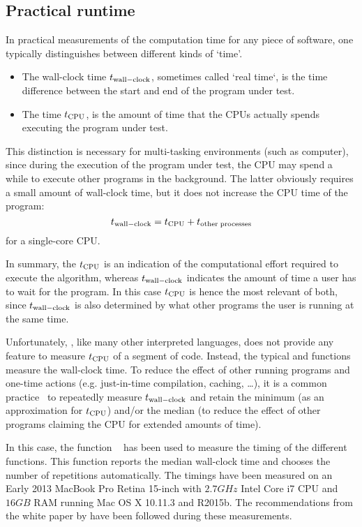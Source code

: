 \subsection{Practical runtime}
In practical measurements of the computation time for any piece of software, one typically distinguishes between different kinds of `time'.
\begin{itemize}
  \item The wall-clock time $t_{\mathrm{wall-clock}}$, sometimes called `real time`, is the time difference between the start and end of the program under test.
  \item The  time $t_{\mathrm{CPU}}$, is the amount of time that the \glspl{CPU} actually spends executing the program under test.
\end{itemize}
This distinction is necessary for multi-tasking environments (such as computer), since during the execution of the program under test, the \gls{CPU} may spend a while to execute other programs in the background.
The latter obviously requires a small amount of wall-clock time, but it does not increase the \gls{CPU} time of the program:
\begin{equation}
  t_{\mathrm{wall-clock}} = t_{\mathrm{CPU}} + t_{\mathrm{other\;processes}}
\end{equation}
for a single-core \gls{CPU}.

In summary, the $t_{\mathrm{CPU}}$ is an indication of the computational effort required to execute the algorithm, whereas $t_{\mathrm{wall-clock}}$ indicates the amount of time a user has to wait for the program.
In this case $t_{\mathrm{CPU}}$ is hence the most relevant of both, since $t_{\mathrm{wall-clock}}$ is also determined by what other programs the user is running at the same time.

Unfortunately, \MATLAB, like many other interpreted languages, does not provide any feature to measure $t_{\mathrm{CPU}}$ of a segment of code.
Instead, the typical  and  functions measure the wall-clock time.
To reduce the effect of other running programs and one-time actions (e.g. just-in-time compilation, caching, \ldots), it is a common practice~\citep{McKeeman2008} to repeatedly measure $t_{\mathrm{wall-clock}}$ and retain the minimum (as an approximation for $t_{\mathrm{CPU}}$) and/or the median (to reduce the effect of other programs claiming the \gls{CPU} for extended amounts of time).

In this case, the \MATLAB function ~\citep{matlab:timeit} has been used to measure the timing of the different functions.
This function  reports the median wall-clock time and chooses the number of repetitions automatically.
The timings have been measured on an Early 2013 MacBook Pro Retina 15-inch with $2.7\unit{GHz}$ Intel Core i7 \gls{CPU} and $16 \unit{GB}$ \gls{RAM} running Mac OS X 10.11.3 and \MATLAB R2015b.
The recommendations from the white paper by \citet{McKeeman2008} have been followed during these measurements.

